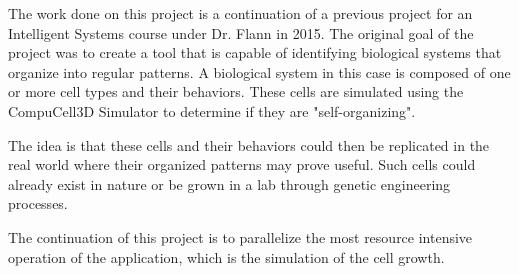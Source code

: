 The work done on this project is a continuation of a previous project for an Intelligent Systems course under Dr. Flann in 2015. The original goal of the project was to create a tool that is capable of identifying biological systems that organize into regular patterns. A biological system in this case is composed of one or more cell types and their behaviors. These cells are simulated using the CompuCell3D Simulator to determine if they are "self-organizing".

The idea is that these cells and their behaviors could then be replicated in the real world where their organized patterns may prove useful. Such cells could already exist in nature or be grown in a lab through genetic engineering processes.

The continuation of this project is to parallelize the most resource intensive operation of the application, which is the simulation of the cell growth.